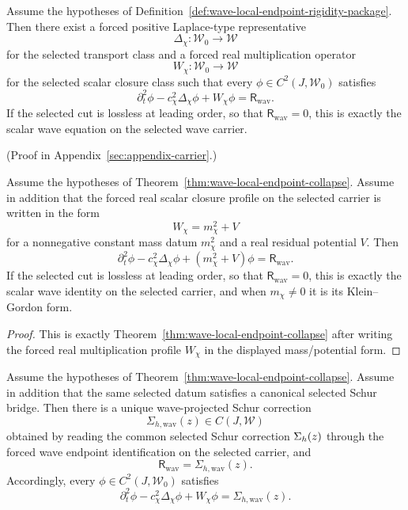 \begin{theorem}
\label{thm:wave-local-endpoint-collapse}
Assume the hypotheses of
Definition~\ref{def:wave-local-endpoint-rigidity-package}. Then there exist a
forced positive Laplace-type representative
\[
\Delta_{\chi}:\mathcal W_0\to\mathcal W
\]
for the selected transport class and a forced real multiplication operator
\[
W_{\chi}:\mathcal W_0\to\mathcal W
\]
for the selected scalar closure class such that every
\(\phi\in C^2(J,\mathcal W_0)\) satisfies
\[
\partial_t^2\phi
-
c_{\chi}^2\Delta_{\chi}\phi
+
W_{\chi}\phi
=
\mathsf R_{\mathrm{wav}}.
\]
If the selected cut is lossless at leading order, so that
\(\mathsf R_{\mathrm{wav}}=0\), this is exactly the scalar wave equation on the
selected wave carrier.
\end{theorem}

(Proof in Appendix~\ref{sec:appendix-carrier}.)

\begin{corollary}
\label{cor:recognizable-wave-kg-identity}
Assume the hypotheses of
Theorem~\ref{thm:wave-local-endpoint-collapse}. Assume in addition that the
forced real scalar closure profile on the selected carrier is written in the
form
\[
W_{\chi}=m_{\chi}^2+V
\]
for a nonnegative constant mass datum \(m_{\chi}^2\) and a real residual
potential \(V\). Then
\[
\partial_t^2\phi
-
c_{\chi}^2\Delta_{\chi}\phi
+
(m_{\chi}^2+V)\phi
=
\mathsf R_{\mathrm{wav}}.
\]
If the selected cut is lossless at leading order, so that
\(\mathsf R_{\mathrm{wav}}=0\), this is exactly the scalar wave identity on the
selected carrier, and when \(m_{\chi}\neq 0\) it is its Klein--Gordon form.
\end{corollary}

\begin{proof}
This is exactly Theorem~\ref{thm:wave-local-endpoint-collapse} after writing the
forced real multiplication profile \(W_{\chi}\) in the displayed
mass/potential form.
\end{proof}

\begin{corollary}
\label{cor:wave-schur-remainder-identity}
Assume the hypotheses of Theorem~\ref{thm:wave-local-endpoint-collapse}. Assume
in addition that the same selected datum satisfies a canonical selected Schur
bridge. Then there is a unique wave-projected Schur correction
\[
\Sigma_{h,\mathrm{wav}}(z)\in C(J,\mathcal W)
\]
obtained by reading the common selected Schur correction \(\Sigma_{h}(z)\)
through the forced wave endpoint identification on the selected carrier, and
\[
\mathsf R_{\mathrm{wav}}=\Sigma_{h,\mathrm{wav}}(z).
\]
Accordingly, every \(\phi\in C^2(J,\mathcal W_0)\) satisfies
\[
\partial_t^2\phi
-
c_{\chi}^2\Delta_{\chi}\phi
+
W_{\chi}\phi
=
\Sigma_{h,\mathrm{wav}}(z).
\]
\end{corollary}

